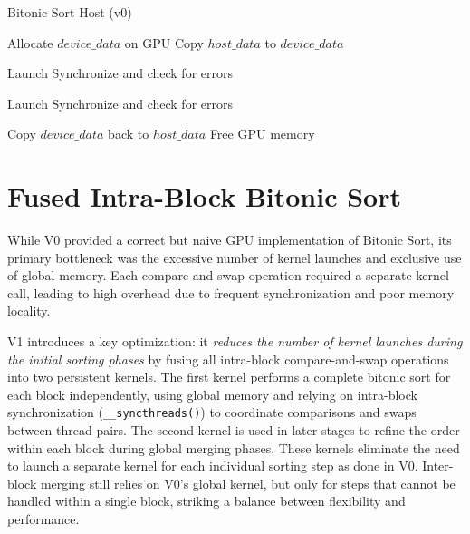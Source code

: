 \documentclass{article}
\begin{document}
\begin{algorithm}[H]
\caption{Bitonic Sort Host (v0)}
\begin{algorithmic}[1]
    \State Allocate $device\_data$ on GPU
    \State Copy $host\_data$ to $device\_data$
    
            \State Launch 
            \State Synchronize and check for errors
        \EndFor
    \EndFor

        \State Launch 
        \State Synchronize and check for errors
    \EndIf

    \State Copy $device\_data$ back to $host\_data$
    \State Free GPU memory
\EndProcedure
\end{algorithmic}
\end{algorithm}




\section{Fused Intra-Block Bitonic Sort}

While V0 provided a correct but naive GPU implementation of Bitonic Sort, its primary bottleneck was the 
excessive number of kernel launches and exclusive use of global memory. Each compare-and-swap operation 
required a separate kernel call, leading to high overhead due to frequent synchronization and poor memory 
locality. 

V1 introduces a key optimization: it \textit{reduces the number of kernel launches during the initial sorting 
phases} by fusing all intra-block compare-and-swap operations into two persistent kernels. The first kernel 
performs a complete bitonic sort for each block independently, using global memory and relying on intra-block 
synchronization (\texttt{\_\_syncthreads()}) to coordinate comparisons and swaps between thread pairs. The second
kernel is used in later stages to refine the order within each block during global merging phases. These kernels 
eliminate the need to launch a separate kernel for each individual sorting step as done in V0. Inter-block merging
still relies on V0's global kernel, but only for steps that cannot be handled within a single block, striking a 
balance between flexibility and performance.
\end{document}
